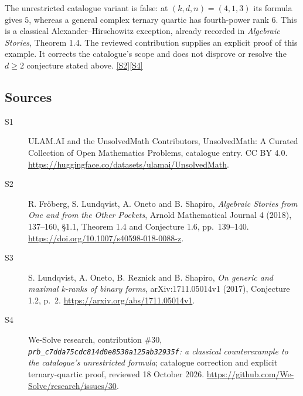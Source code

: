 \documentclass[11pt]{article}
\newcommand{\sref}[2]{\hyperlink{source:#1:#2}{[S#2]}}
\begin{document}
The unrestricted catalogue variant is false: at $(k,d,n)=(4,1,3)$ its formula gives $5$, whereas a general complex ternary quartic has fourth-power rank $6$. This is a classical Alexander--Hirschowitz exception, already recorded in \emph{Algebraic Stories}, Theorem 1.4. The reviewed contribution supplies an explicit proof of this example. It corrects the catalogue's scope and does not disprove or resolve the $d\geq2$ conjecture stated above. \sref{statement}{2}\sref{statement}{4}
\subsection{Sources}
\begin{description}
\item[\hypertarget{source:statement:1}{S1}] ULAM.AI and the UnsolvedMath Contributors, UnsolvedMath: A Curated Collection of Open Mathematics Problems, catalogue entry. CC BY 4.0. \url{https://huggingface.co/datasets/ulamai/UnsolvedMath}.
\item[\hypertarget{source:statement:2}{S2}] R. Fröberg, S. Lundqvist, A. Oneto and B. Shapiro, \emph{Algebraic Stories from One and from the Other Pockets}, Arnold Mathematical Journal 4 (2018), 137--160, §1.1, Theorem 1.4 and Conjecture 1.6, pp.~139--140. \url{https://doi.org/10.1007/s40598-018-0088-z}.
\item[\hypertarget{source:statement:3}{S3}] S. Lundqvist, A. Oneto, B. Reznick and B. Shapiro, \emph{On generic and maximal k-ranks of binary forms}, arXiv:1711.05014v1 (2017), Conjecture 1.2, p.~2. \url{https://arxiv.org/abs/1711.05014v1}.
\item[\hypertarget{source:statement:4}{S4}] We-Solve research, contribution \#30, \emph{\texttt{prb\_c7dda75cdc814d0e8538a125ab32935f}: a classical counterexample to the catalogue's unrestricted formula}; catalogue correction and explicit ternary-quartic proof, reviewed 18 October 2026. \url{https://github.com/We-Solve/research/issues/30}.
\end{description}
\label{end:statement}
\end{document}
